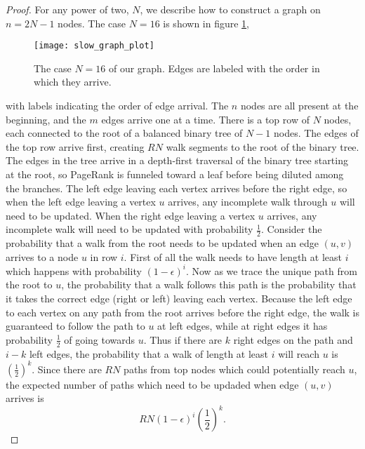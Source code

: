 \documentclass{article}
\newcommand{\pn}[1]{\left( #1 \right)}
\begin{document}
\begin{proof} For any power of two, $N$, we describe how to construct a graph on $n = 2N-1$ nodes.  The case $N=16$ is shown in figure \ref{fig:graph},
  \begin{figure}[tbh]
    \centering
    \texttt{[image: slow\_graph\_plot]}
\caption{The case $N=16$ of our graph.  Edges are labeled with the order in which they arrive.}
    \label{fig:graph}
  \end{figure}
 with labels indicating the order of edge arrival.  The $n$ nodes are all present at the beginning, and the $m$ edges arrive one at a time.  There is a top row of $N$ nodes, each connected to the root of a balanced binary tree of $N-1$ nodes.  The edges of the top row arrive first, creating $RN$ walk segments to the root of the binary tree.  The edges in the tree arrive in a depth-first traversal of the binary tree starting at the root, so PageRank is funneled toward a leaf before being diluted among the branches.  The left edge leaving each vertex arrives before the right edge, so when the left edge leaving a vertex $u$ arrives, any incomplete walk through $u$  will need to be updated.  When the right edge leaving a vertex $u$ arrives, any incomplete walk will need to be updated with probability $\frac{1}{2}$.  Consider the probability that a walk from the root needs to be updated when an edge $(u,v)$ arrives to a node $u$ in row $i$.  First of all the walk needs to have length at least $i$ which happens with probability $(1-\epsilon)^i$.  Now as we trace the unique path from the root to $u$, the probability that a walk follows this path is the probability that it takes the correct edge (right or left) leaving each vertex.  Because the left edge to each vertex on any path from the root arrives before the right edge, the walk is guaranteed to follow the path to $u$ at left edges, while at right edges it has probability $\frac{1}{2}$ of going towards $u$.  Thus if there are $k$ right edges on the path and $i-k$ left edges, the probability that a walk of length at least $i$ will reach $u$ is $\pn{\frac{1}{2}}^k$.   Since there are $RN$ paths from top nodes which could potentially reach $u$, the expected number of paths which need to be updaded when edge $(u,v)$ arrives is
\[R N(1-\epsilon)^i  \left(\frac{1}{2}\right)^k .\]


\end{proof}
\end{document}
